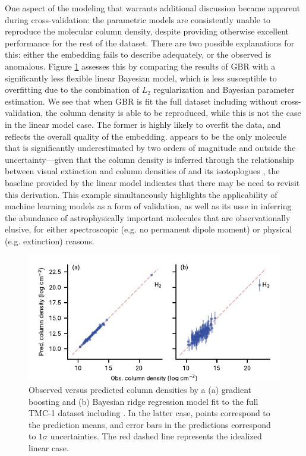\documentclass[twocolumn]{aastex63}
\begin{document}
One aspect of the modeling that warrants additional discussion became apparent during cross-validation: the parametric models are consistently unable to reproduce the molecular  column density, despite providing otherwise excellent performance for the rest of the dataset. There are two possible explanations for this: either the embedding fails to describe  adequately, or the observed  is anomalous. Figure \ref{fig:bayes} assesses this by comparing the results of GBR with a significantly less flexible linear Bayesian model, which is less susceptible to overfitting due to the combination of $L_2$ regularization and Bayesian parameter estimation. We see that when GBR is fit the full dataset including  without cross-validation, the column density is able to be reproduced, while this is not the case in the linear model case. The former is highly likely to overfit the data, and reflects the overall quality of the embedding.  appears to be the only molecule that is significantly underestimated by two orders of magnitude and outside the uncertainty---given that the  column density is inferred through the relationship between visual extinction and column densities of  and its isotoplogues \citep{cernicharo_physical_1987}, the baseline provided by the linear model indicates that there may be need to revisit this derivation. This example simultaneously highlights the applicability of machine learning models as a form of validation, as well as its usse in inferring the abundance of astrophysically important molecules that are observationally elusive, for either spectroscopic (e.g. no permanent dipole moment) or physical (e.g. extinction) reasons. 

\begin{figure}
    \centering
    \includegraphics[width=\columnwidth]{bayes_ridge_h2.pdf}
    \caption{Observed versus predicted column densities by a (a) gradient boosting and (b) Bayesian ridge regression model fit to the full TMC-1 dataset including . In the latter case, points correspond to the prediction means, and error bars in the predictions correspond to $1\sigma$ uncertainties. The red dashed line represents the idealized linear case.}
    \label{fig:bayes}
\end{figure}
\end{document}
